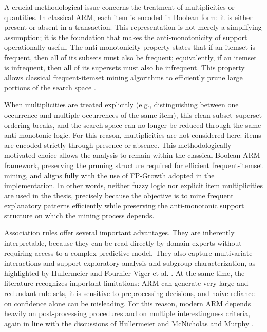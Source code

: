 A crucial methodological issue concerns the treatment of multiplicities or quantities.
In classical ARM, each item is encoded in Boolean form: it is either present or absent in a transaction. This representation is not merely a simplifying assumption; it is the foundation that makes the anti-monotonicity of support operationally useful.
The anti-monotonicity property states that if an itemset is frequent, then all of its subsets must also be frequent; equivalently, if an itemset is infrequent, then all of its supersets must also be infrequent. This property allows classical frequent-itemset mining algorithms to efficiently prune large portions of the search space \cite{agrawal1994fast,han2000mining}.

When multiplicities are treated explicitly (e.g., distinguishing between one occurrence and multiple occurrences of the same item), this clean subset--superset ordering breaks, and the search space can no longer be reduced through the same anti-monotonic logic.
For this reason, multiplicities are not considered here: items are encoded strictly through presence or absence. This methodologically motivated choice allows the analysis to remain within the classical Boolean ARM framework, preserving the pruning structure required for efficient frequent-itemset mining, and aligns fully with the use of FP-Growth adopted in the implementation. In other words, neither fuzzy logic nor explicit item multiplicities are used in the thesis, precisely because the objective is to mine frequent explanatory patterns efficiently while preserving the anti-monotonic support structure on which the mining process depends.

Association rules offer several important advantages. They are inherently interpretable, because they can be read directly by domain experts without requiring access to a complex predictive model. They also capture multivariate interactions and support exploratory analysis and subgroup characterization, as highlighted by Hullermeier \cite{hullermeier2006association} and Fournier-Viger et al. \cite{fournierviger2017survey}. At the same time, the literature recognizes important limitations: ARM can generate very large and redundant rule sets, it is sensitive to preprocessing decisions, and naive reliance on confidence alone can be misleading. For this reason, modern ARM depends heavily on post-processing procedures and on multiple interestingness criteria, again in line with the discussions of Hullermeier \cite{hullermeier2006association} and McNicholas and Murphy \cite{mcnicholas2008lift}.

